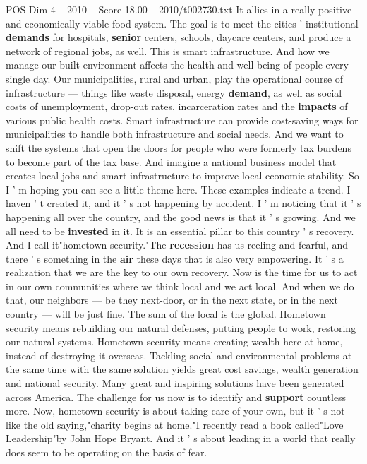 \begin{textsample}{POS Dim 4 – 2010 – Score 18.00 – 2010/t002730.txt}
It allies in a really positive and economically viable food system.
The goal is to meet the cities ' institutional \textbf{demands} for hospitals, \textbf{senior} centers, schools, daycare centers, and produce a network of regional jobs, as well.
This is smart infrastructure.
And how we manage our built environment affects the health and well-being of people every single day.
Our municipalities, rural and urban, play the operational course of infrastructure — things like waste disposal, energy \textbf{demand}, as well as social costs of unemployment, drop-out rates, incarceration rates and the \textbf{impacts} of various public health costs.
Smart infrastructure can provide cost-saving ways for municipalities to handle both infrastructure and social needs.
And we want to shift the systems that open the doors for people who were formerly tax burdens to become part of the tax base.
And imagine a national business model that creates local jobs and smart infrastructure to improve local economic stability.
So I ' m hoping you can see a little theme here.
These examples indicate a trend.
I haven ' t created it, and it ' s not happening by accident.
I ' m noticing that it ' s happening all over the country, and the good news is that it ' s growing.
And we all need to be \textbf{invested} in it.
It is an essential pillar to this country ' s recovery.
And I call it"hometown security."The \textbf{recession} has us reeling and fearful, and there ' s something in the \textbf{air} these days that is also very empowering.
It ' s a realization that we are the key to our own recovery.
Now is the time for us to act in our own communities where we think local and we act local.
And when we do that, our neighbors — be they next-door, or in the next state, or in the next country — will be just fine.
The sum of the local is the global.
Hometown security means rebuilding our natural defenses, putting people to work, restoring our natural systems.
Hometown security means creating wealth here at home, instead of destroying it overseas.
Tackling social and environmental problems at the same time with the same solution yields great cost savings, wealth generation and national security.
Many great and inspiring solutions have been generated across America.
The challenge for us now is to identify and \textbf{support} countless more.
Now, hometown security is about taking care of your own, but it ' s not like the old saying,"charity begins at home."I recently read a book called"Love Leadership"by John Hope Bryant.
And it ' s about leading in a world that really does seem to be operating on the basis of fear.

\end{textsample}
